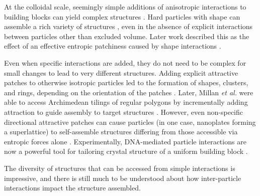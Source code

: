 At the colloidal scale, seemingly simple additions of anisotropic interactions to building blocks can yield complex structures \cite{GlotzerSolomon_2007_Nature}.
Hard particles with shape can assemble a rich variety of structures \cite{Damasceno_2012_Science}, even in the absence of explicit interactions between particles other than excluded volume.
Later work described this as the effect of an effective entropic patchiness caused by shape interactions \cite{vanAnders_2014_ACSNano}.

Even when specific interactions are added, they do not need to be complex for small changes to lead to very different structures.
Adding explicit attractive patches to otherwise isotropic particles led to the formation of shapes, clusters, and rings, depending on the orientation of the patches \cite{Zhang_2004_NanoLetters}.
Later, Millan \textit{et al.} were able to access Archimedean tilings of regular polygons by incrementally adding attraction to guide assembly to target structures \cite{Millan_2014_ACSNano}.
However, even non-specific directional attractive patches can cause particles (in one case, nanoplates forming a superlattice) to self-assemble structures differing from those accessible via entropic forces alone \cite{Ye_2013_NatChem}.
Experimentally, DNA-mediated particle interactions are now a powerful tool for tailoring crystal structure of a uniform building block \cite{Park_2008_Nature}.

The diversity of structures that can be accessed from simple interactions is impressive, and there is still much to be understood about how inter-particle interactions impact the structure assembled.

